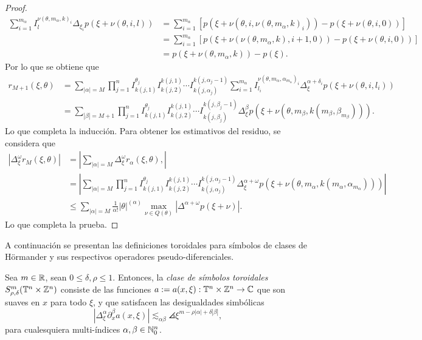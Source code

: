 \begin{proof}
	\begin{align*}
		\sum_{i=1}^{m_\alpha} I^{\nu(\theta, m_\alpha, k)_i}_l \Delta_{\xi_i}p(\xi+\nu(\theta, i, l)) &=  \sum_{i=1}^{m_\alpha} [p(\xi+\nu(\theta, i, \nu(\theta, m_\alpha, k)_i)) - p(\xi+\nu(\theta, i, 0))]\\
		&=  \sum_{i=1}^{m_\alpha} [p(\xi+\nu(\nu(\theta, m_\alpha, k), i+1, 0)) - p(\xi+\nu(\theta, i, 0))]\\
		& =p(\xi+\nu(\theta,m_\alpha,k)) - p(\xi) .
	\end{align*}
	Por lo que se obtiene que
	\begin{align*}
		r_{M+1}(\xi, \theta) & = \sum_{|\alpha|=M} \prod_{j=1}^n I^{\theta_j}_{k(j, 1)} I^{k(j, 1)}_{k(j, 2)} \cdots I^{k(j, \alpha_j-1)}_{k(j, \alpha_j)} \sum_{i=1}^{m_\alpha} I^{\nu(\theta, m_\alpha, \alpha_{m_\alpha})_i}_{l_i} \Delta_{\xi}^{\alpha+\delta_i}p(\xi+\nu(\theta, i, l_i))\\
		& = \sum_{|\beta|=M+1} \prod_{j=1}^n I^{\theta_j}_{k(j, 1)} I^{k(j, 1)}_{k(j, 2)} \cdots I^{k(j, \beta_j-1)}_{k(j, \beta_j)} \Delta^\beta_\xi p(\xi + \nu(\theta, m_\beta, k(m_\beta, \beta_{m_\beta}))).
	\end{align*}
	Lo que completa la inducción. Para obtener los estimativos del residuo, se considera que 
	\begin{align*}
		|\Delta^\omega_\xi r_M(\xi, \theta)| & = \left|\sum_{|\alpha|=M}\Delta^{\omega}_\xi r_\alpha(\xi, \theta), 
		\right| \\
		& = \left| \sum_{|\alpha|=M}\prod_{j=1}^n I^{\theta_j}_{k(j, 1)} I^{k(j, 1)}_{k(j, 2)} \cdots I^{k(j, \alpha_j-1)}_{k(j, \alpha_j)} \Delta^{\alpha+\omega}_\xi p(\xi + \nu(\theta, m_\alpha, k(m_\alpha, \alpha_{m_\alpha})))
		\right| \\
		& \leq \sum_{|\alpha|=M} \frac{1}{\alpha!} |\theta|^{(\alpha)}  \max_{\nu\in Q(\theta)} |\Delta^{\alpha+\omega} p(\xi+\nu)|.
	\end{align*}
	Lo que completa la prueba.
\end{proof}
A continuación se presentan las definiciones toroidales para símbolos de clases de H\"ormander y sus respectivos operadores pseudo-diferenciales.
\begin{definition}
	Sea $m\in\mathbb{R}$, sean $0\leq\delta,\rho\leq1$. Entonces, la \textit{clase de símbolos toroidales} $S^m_{\rho, \delta}(\mathbb{T}^n\times\mathbb{Z}^n)$ consiste de las funciones $a:=a(x, \xi):\mathbb{T}^n\times\mathbb{Z}^n\to\mathbb{C}$ que son suaves en $x$ para todo $\xi$, y que satisfacen las desigualdades simbólicas
	\begin{equation*}
		|\Delta^\alpha_\xi\partial^\beta_x a(x, \xi)| \lesssim_{\alpha\beta} \angles{\xi}^{m-\rho|\alpha|+\delta|\beta|}, 
	\end{equation*}
	para cualesquiera multi-índices $\alpha,\beta\in\mathbb{N}_0^n$. 
\end{definition}

